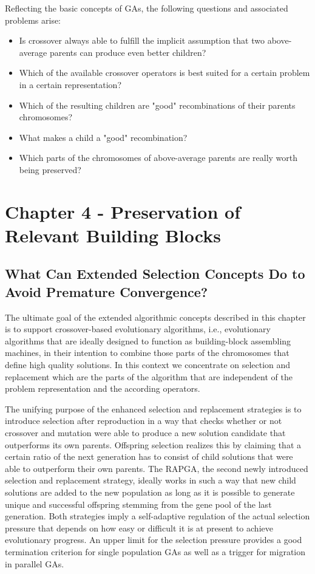 \documentclass[12pt]{article}
\begin{document}
Reflecting the basic concepts of GAs, the following questions and associated problems arise:
\begin{itemize}
\item Is crossover always able to fulfill the implicit assumption that two above-average parents can produce even better children?
\item Which of the available crossover operators is best suited for a certain problem in a certain representation?
\item Which of the resulting children are "good" recombinations of their parents chromosomes?
\item What makes a child a "good" recombination?
\item Which parts of the chromosomes of above-average parents are really worth being preserved?
\end{itemize}
\clearpage

\section{Chapter 4 - Preservation of Relevant Building Blocks}
\subsection{What Can Extended Selection Concepts Do to Avoid Premature Convergence?}
The ultimate goal of the extended algorithmic concepts described in this chapter is to support crossover-based evolutionary algorithms, i.e., evolutionary algorithms that are ideally designed to function as building-block assembling machines, in their intention to combine those parts of the chromosomes that define high quality solutions. In this context we concentrate on selection and replacement which are the parts of the algorithm that are independent of the problem representation and the according operators.

The unifying purpose of the enhanced selection and replacement strategies is to introduce selection after reproduction in a way that checks whether or not crossover and mutation were able to produce a new solution candidate that outperforms its own parents. Offspring selection realizes this by claiming that a certain ratio of the next generation has to consist of child solutions that were able to outperform their own parents. The RAPGA, the second newly introduced selection and replacement strategy, ideally works in such a way that new child solutions are added to the new population as long as it is possible to generate unique and successful offspring stemming from the gene pool of the last generation. Both strategies imply a self-adaptive regulation of the actual selection pressure that depends on how easy or difficult it is at present to achieve evolutionary progress. An upper limit for the selection pressure provides a good termination criterion for single population GAs as well as a trigger for migration in parallel GAs.
\end{document}
